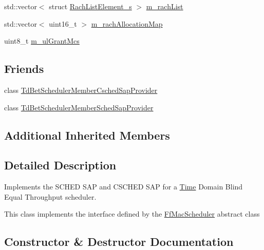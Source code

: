 \begin{DoxyCompactItemize}
\item 
std\+::vector$<$ struct \hyperlink{structns3_1_1RachListElement__s}{Rach\+List\+Element\+\_\+s} $>$ \hyperlink{classns3_1_1TdBetFfMacScheduler_ac88efaa3ffc00af6dd71b21d2bef0448}{m\+\_\+rach\+List}
\item 
std\+::vector$<$ uint16\+\_\+t $>$ \hyperlink{classns3_1_1TdBetFfMacScheduler_a985948ee40a0d721009dea792474ee51}{m\+\_\+rach\+Allocation\+Map}
\item 
uint8\+\_\+t \hyperlink{classns3_1_1TdBetFfMacScheduler_ae0ced77c5d773079c66921b86561de8c}{m\+\_\+ul\+Grant\+Mcs}
\end{DoxyCompactItemize}
\subsection*{Friends}
\begin{DoxyCompactItemize}
\item 
class \hyperlink{classns3_1_1TdBetFfMacScheduler_a172e38de62325e7bb5cb02ce692f70e5}{Td\+Bet\+Scheduler\+Member\+Csched\+Sap\+Provider}
\item 
class \hyperlink{classns3_1_1TdBetFfMacScheduler_ac2214986e1dc350cc1dc34f7c7a0bc87}{Td\+Bet\+Scheduler\+Member\+Sched\+Sap\+Provider}
\end{DoxyCompactItemize}
\subsection*{Additional Inherited Members}


\subsection{Detailed Description}
Implements the S\+C\+H\+ED S\+AP and C\+S\+C\+H\+ED S\+AP for a \hyperlink{classns3_1_1Time}{Time} Domain Blind Equal Throughput scheduler. 

This class implements the interface defined by the \hyperlink{classns3_1_1FfMacScheduler}{Ff\+Mac\+Scheduler} abstract class 

\subsection{Constructor \& Destructor Documentation}
